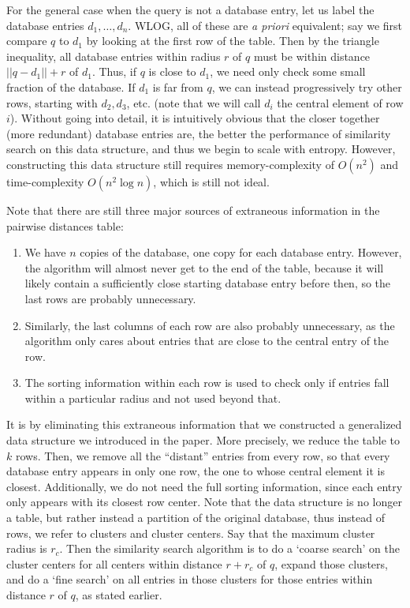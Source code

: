\documentclass{amsbook}
\theoremstyle{definition}
\theoremstyle{remark}
\numberwithin{equation}{section}
\begin{document}
For the general case when the query is not a database entry, let us label the database entries $d_1, \ldots, d_n$.
WLOG, all of these are \textit{a priori} equivalent; say we first compare $q$ to $d_1$ by looking at the first row of the table.
Then by the triangle inequality, all database entries within radius $r$ of $q$ must be within distance $||q-d_1|| +r$ of $d_1$.
Thus, if $q$ is close to $d_1$, we need only check some small fraction of the database.
If $d_1$ is far from $q$, we can instead progressively try other rows, starting with $d_2, d_3$, etc.
(note that we will call $d_i$ the central element of row $i$).
Without going into detail, it is intuitively obvious that the closer together (more redundant) database entries are, the better the performance of similarity search on this data structure, and thus we begin to scale with entropy.
However, constructing this data structure still requires memory-complexity of $O(n^2)$ and time-complexity $O(n^2 \log n)$, which is still not ideal.

Note that there are still three major sources of extraneous information in the pairwise distances table:

\begin{enumerate}
    \item We have $n$ copies of the database, one copy for each database entry.
However, the algorithm will almost never get to the end of the table, because it will likely contain a sufficiently close starting database entry before then, so the last rows are probably unnecessary.
    \item Similarly, the last columns of each row are also probably unnecessary, as the algorithm only cares about entries that are close to the central entry of the row.
    \item The sorting information within each row is used to check only if entries fall within a particular radius and not used beyond that.
\end{enumerate}

It is by eliminating this extraneous information that we constructed a generalized data structure we introduced in the paper.
More precisely, we reduce the table to $k$ rows.
Then, we remove all the ``distant'' entries from every row, so that every database entry appears in only one row, the one to whose central element it is closest.
Additionally, we do not need the full sorting information, since each entry only appears with its closest row center.
Note that the data structure is no longer a table, but rather instead a partition of the original database, thus instead of rows, we refer to clusters and cluster centers.
Say that the maximum cluster radius is $r_c$.
Then the similarity search algorithm is to do a `coarse search' on the cluster centers for all centers within distance $r+r_c$ of $q$, expand those clusters, and do a ‘fine search’ on all entries in those clusters for those entries within distance $r$ of $q$, as stated earlier.
\end{document}
